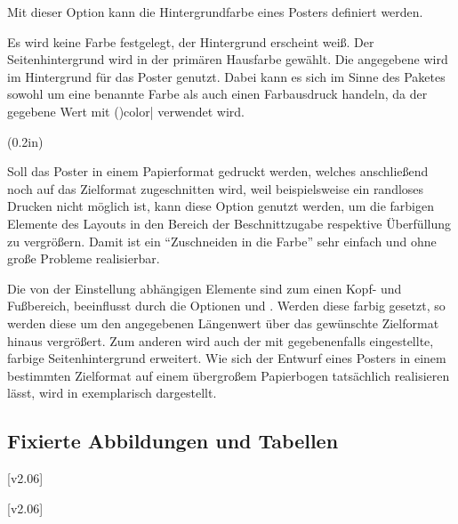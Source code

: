 \begin{DeclareEntity}{}
\begin{Declaration}
Mit dieser Option kann die Hintergrundfarbe eines Posters definiert werden.
%
\begin{DeclareValues}{}
  Es wird keine Farbe festgelegt, der Hintergrund erscheint weiß.
  Der Seitenhintergrund wird in der primären Hausfarbe  gewählt.
  Die angegebene  wird im Hintergrund für das Poster genutzt. 
  Dabei kann es sich im Sinne des Paketes  sowohl um eine 
  benannte Farbe als auch einen Farbausdruck handeln, da der gegebene Wert mit 
  \Macro(){color|} verwendet wird.
\end{DeclareValues}
\end{Declaration}

\begin{Declaration}
  {}
  (0.2in)

Soll das Poster in einem Papierformat gedruckt werden, welches anschließend 
noch auf das Zielformat zugeschnitten wird, weil beispielsweise ein randloses 
Drucken nicht möglich ist, kann diese Option genutzt werden, um die farbigen 
Elemente des Layouts in den Bereich der Beschnittzugabe respektive Überfüllung 
zu vergrößern. Damit ist ein \enquote{Zuschneiden in die Farbe} sehr einfach 
und ohne große Probleme realisierbar.

Die von der Einstellung  abhängigen 
Elemente sind zum einen Kopf- und Fußbereich, beeinflusst durch die Optionen 
 und . Werden diese farbig gesetzt, so werden 
diese um den angegebenen Längenwert über das gewünschte Zielformat hinaus 
vergrößert. Zum anderen wird auch der mit  gegebenenfalls 
eingestellte, farbige Seitenhintergrund erweitert. Wie sich der Entwurf eines 
Posters in einem bestimmten Zielformat auf einem übergroßem Papierbogen 
tatsächlich realisieren lässt, wird in  exemplarisch 
dargestellt.
\end{Declaration}



\subsection{Fixierte Abbildungen und Tabellen}

\begin{Declaration}
  {}
  [v2.06]
\begin{Declaration}
  {}
  [v2.06]
\printdeclarationlist[Gleitobjekte]


\end{Declaration}
\end{Declaration}
\end{DeclareEntity}
